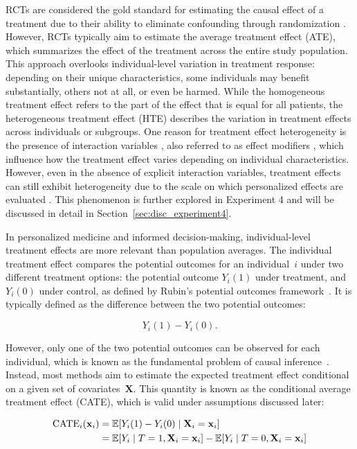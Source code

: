 RCTs are considered the gold standard for estimating the causal effect of a treatment due to their ability to eliminate confounding through randomization \citep{little2000}. However, RCTs typically aim to estimate the average treatment effect (ATE), which summarizes the effect of the treatment across the entire study population. This approach overlooks individual-level variation in treatment response: depending on their unique characteristics, some individuals may benefit substantially, others not at all, or even be harmed. While the homogeneous treatment effect refers to the part of the effect that is equal for all patients, the heterogeneous treatment effect (HTE) describes the variation in treatment effects across individuals or subgroups. One reason for treatment effect heterogeneity is the presence of interaction variables \citep{hoogland2021}, also referred to as effect modifiers \citep{christensen2021}, which influence how the treatment effect varies depending on individual characteristics. However, even in the absence of explicit interaction variables, treatment effects can still exhibit heterogeneity due to the scale on which personalized effects are evaluated \citep{hoogland2021}. This phenomenon is further explored in Experiment 4 and will be discussed in detail in Section~\ref{sec:disc_experiment4}.

In personalized medicine and informed decision-making, individual-level treatment effects are more relevant than population averages. The individual treatment effect compares the potential outcomes for an individual~$i$ under two different treatment options: the potential outcome $Y_i(1)$ under treatment, and $Y_i(0)$ under control, as defined by Rubin's potential outcomes framework~\citep{rubin2005}. It is typically defined as the difference between the two potential outcomes:

\begin{equation}
Y_i(1) - Y_i(0).
\end{equation}

However, only one of the two potential outcomes can be observed for each individual, which is known as the fundamental problem of causal inference~\citep{holland1986}. Instead, most methods aim to estimate the expected treatment effect conditional on a given set of covariates~$\mathbf{X}$. This quantity is known as the conditional average treatment effect (CATE), which is valid under assumptions discussed later:


\begin{align}
\text{CATE}_i(\mathbf{x}_i) &= \mathbb{E}[Y_i(1) - Y_i(0) \mid \mathbf{X}_i = \mathbf{x}_i] \notag \\
                 &= \mathbb{E}[Y_i \mid T = 1, \mathbf{X}_i = \mathbf{x}_i] - \mathbb{E}[Y_i \mid T = 0, \mathbf{X}_i = \mathbf{x}_i]
\end{align}


